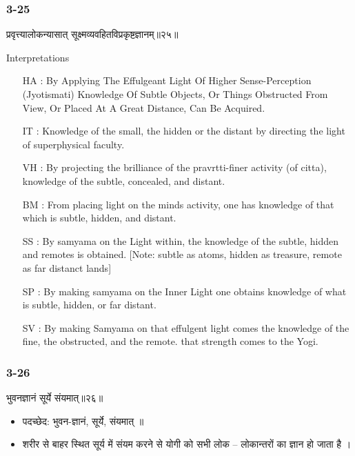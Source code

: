 \begin{frame}[fragile]\frametitle{3-25}
\begin{sanskrit}
प्रवृत्त्यालोकन्यासात् सूक्ष्मव्यवहितविप्रकृष्टज्ञानम्॥२५॥
\end{sanskrit}

Interpretations
\begin{itemize}	
\item [HA]: By Applying The Effulgeant Light Of Higher Sense-Perception (Jyotismati) Knowledge Of Subtle Objects, Or Things Obstructed From View, Or Placed At A Great Distance, Can Be Acquired.
\item [IT]: Knowledge of the small, the hidden or the distant by directing the light of superphysical faculty.
\item [VH]: By projecting the brilliance of the pravrtti-finer activity (of citta), knowledge of the subtle, concealed, and distant.
\item [BM]: From placing light on the minds activity, one has knowledge of that which is subtle, hidden, and distant.
\item [SS]: By samyama on the Light within, the knowledge of the subtle, hidden and remotes is obtained. [Note: subtle as atoms, hidden as treasure, remote as far distanct lands]
\item [SP]: By making samyama on the Inner Light one obtains knowledge of what is subtle, hidden, or far distant.
\item [SV]: By making Samyama on that effulgent light comes the knowledge of the fine, the obstructed, and the remote. that strength comes to the Yogi. 
\end{itemize}
\end{frame}

\begin{frame}[fragile]\frametitle{3-26}
\begin{sanskrit}
भुवनज्ञानं सूर्ये संयमात्॥२६॥
\end{sanskrit}

\begin{itemize}
\item पदच्छेद:  भुवन-ज्ञानं, सूर्ये, संयमात् ॥
\item  शरीर से बाहर स्थित सूर्य में संयम करने से योगी को सभी लोक – लोकान्तरों का ज्ञान हो जाता है ।
\end{itemize}
\end{frame}


